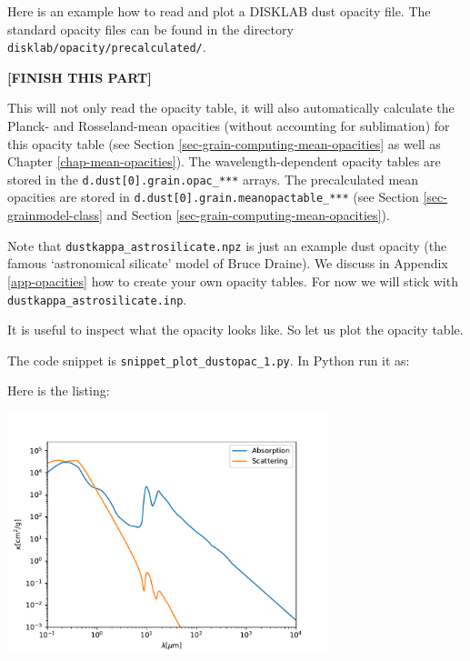 \documentclass{book}
\newcommand{\code}[1]{{\small\tt #1}}
\begin{document}
Here is an example how to read and plot a {\sf DISKLAB} dust opacity file. The
standard opacity files can be found in the directory
\code{disklab/opacity/precalculated/}.

{\bf [FINISH THIS PART]}


This will not only read the opacity table, it will also automatically calculate
the Planck- and Rosseland-mean opacities (without accounting for sublimation)
for this opacity table (see Section \ref{sec-grain-computing-mean-opacities} as
well as Chapter \ref{chap-mean-opacities}). The wavelength-dependent opacity
tables are stored in the \code{d.dust[0].grain.opac\_***} arrays.  The
precalculated mean opacities are stored in
\code{d.dust[0].grain.meanopactable\_***} (see Section
\ref{sec-grainmodel-class} and Section
\ref{sec-grain-computing-mean-opacities}).

Note that \code{dustkappa\_astrosilicate.npz} is just an example dust opacity
(the famous `astronomical silicate' model of Bruce Draine).
We discuss in Appendix \ref{app-opacities} how to create your own
opacity tables. For now we will stick with \code{dustkappa\_astrosilicate.inp}.

It is useful to inspect what the opacity looks like. So let us plot the opacity
table.

The code snippet is
\code{snippet\_plot\_dustopac\_1.py}. In Python run it as:
\begin{codebox}
\end{codebox}
Here is the listing:

\centerline{\includegraphics[width=0.7\textwidth]{../snippets/fig_snippet_plot_dustopac_1_1.pdf}}
\end{document}
